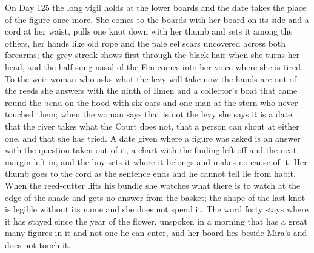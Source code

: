\documentclass{design/chronicle}
\begin{document}
{On Day 125 the long vigil holds at the lower boards and the date takes the place of the figure once more. She comes to the boards with her board on its side and a cord at her waist, pulls one knot down with her thumb and sets it among the others, her hands like old rope and the pale eel scars uncovered across both forearms; the grey streak shows first through the black hair when she turns her head, and the half-sung nasal of the Fen comes into her voice where she is tired. To the weir woman who asks what the levy will take now the hands are out of the reeds she answers with the ninth of Ilmen and a collector’s boat that came round the bend on the flood with six oars and one man at the stern who never touched them; when the woman says that is not the levy she says it is a date, that the river takes what the Court does not, that a person can shout at either one, and that she has tried. A date given where a figure was asked is an answer with the question taken out of it, a chart with the finding left off and the neat margin left in, and the boy sets it where it belongs and makes no cause of it. Her thumb goes to the cord as the sentence ends and he cannot tell lie from habit. When the reed-cutter lifts his bundle she watches what there is to watch at the edge of the shade and gets no answer from the basket; the shape of the last knot is legible without its name and she does not spend it. The word forty stays where it has stayed since the year of the flower, unspoken in a morning that has a great many figures in it and not one he can enter, and her board lies beside Mira’s and does not touch it.

}
\end{document}
